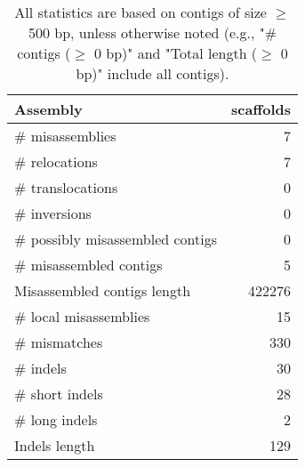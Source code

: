 \documentclass[12pt,a4paper]{article}
\begin{document}
\begin{table}[ht]
\begin{center}
\caption{All statistics are based on contigs of size $\geq$ 500 bp, unless otherwise noted (e.g., "\# contigs ($\geq$ 0 bp)" and "Total length ($\geq$ 0 bp)" include all contigs).}
\begin{tabular}{|l*{1}{|r}|}
\hline
Assembly & scaffolds \\ \hline
\# misassemblies & 7 \\ \hline
\hspace{5mm}\# relocations & 7 \\ \hline
\hspace{5mm}\# translocations & 0 \\ \hline
\hspace{5mm}\# inversions & 0 \\ \hline
\# possibly misassembled contigs & 0 \\ \hline
\# misassembled contigs & 5 \\ \hline
Misassembled contigs length & 422276 \\ \hline
\# local misassemblies & 15 \\ \hline
\# mismatches & 330 \\ \hline
\# indels & 30 \\ \hline
\hspace{5mm}\# short indels & 28 \\ \hline
\hspace{5mm}\# long indels & 2 \\ \hline
Indels length & 129 \\ \hline
\end{tabular}
\end{center}
\end{table}
\end{document}
